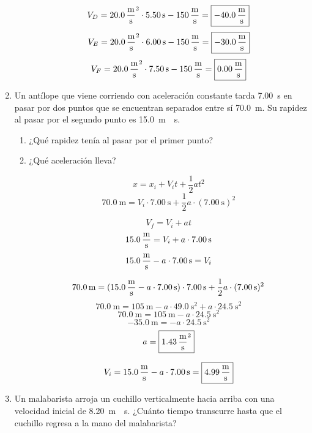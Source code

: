 \documentclass[Física - Práctica.root.tex]{subfiles}
\begin{document}
\begin{enumerate}
\begin{itemize}
\begin{multicols}{2}
                  \[V_D=\SI{20,0}{\meter\over\second\squared}\cdot\SI{5,50}{\second}-\SI{150}{\meter\over\second}=\boxed{\SI{-40,0}{\meter\over\second}}\]
                  \[V_E=\SI{20,0}{\meter\over\second\squared}\cdot\SI{6,00}{\second}-\SI{150}{\meter\over\second}=\boxed{\SI{-30,0}{\meter\over\second}}\]
                  \[V_F=\SI{20,0}{\meter\over\second\squared}\cdot\SI{7,50}{\second}-\SI{150}{\meter\over\second}=\boxed{\SI{0,00}{\meter\over\second}}\]
                \end{multicols}
        \end{itemize}

  \item Un antílope que viene corriendo con aceleración constante tarda \SI{7,00}{\second} en pasar por dos puntos que se encuentran separados entre sí \SI{70,0}{\meter}. Su rapidez al pasar por el segundo punto es \SI{15,0}{\meter\over\second}.

        \begin{enumerate}
          \item ¿Qué rapidez tenía al pasar por el primer punto?
          \item ¿Qué aceleración lleva?

                \[x=x_i+V_it+\frac{1}{2}at^2\]
                \[\SI{70,0}{\meter}=V_i\cdot\SI{7,00}{\second}+\frac{1}{2}a\cdot(\SI{7,00}{\second})^2\]

                \[V_f=V_i+at\]
                \[\SI{15,0}{\meter\over\second}=V_i+a\cdot\SI{7,00}{\second}\]
                \[\SI{15,0}{\meter\over\second}-a\cdot\SI{7,00}{\second}=V_i\]

                \[\SI{70,0}{\meter}=(\SI{15,0}{\meter\over\second}-a\cdot\SI{7,00}{\second})\cdot\SI{7,00}{\second}+\frac{1}{2}a\cdot(\SI{7,00}{\second})^2\]
                \[\SI{70,0}{\meter}=\SI{105}{\meter}-a\cdot\SI{49,0}{\second\squared}+a\cdot\SI{24,5}{\second}^2\]
                \[\SI{70,0}{\meter}=\SI{105}{\meter}-a\cdot\SI{24,5}{\second\squared}\]
                \[\SI{-35,0}{\meter}=-a\cdot\SI{24,5}{\second\squared}\]
                \[a=\boxed{\SI{1,43}{\meter\over\second\squared}}\]

                \[V_i=\SI{15,0}{\meter\over\second}-a\cdot\SI{7,00}{\second}=\boxed{\SI{4,99}{\meter\over\second}}\]
        \end{enumerate}

  \item Un malabarista arroja un cuchillo verticalmente hacia arriba con una velocidad inicial de \SI{8,20}{\meter\over\second}. ¿Cuánto tiempo transcurre hasta que el cuchillo regresa a la mano del malabarista?


\end{enumerate}
\end{document}
